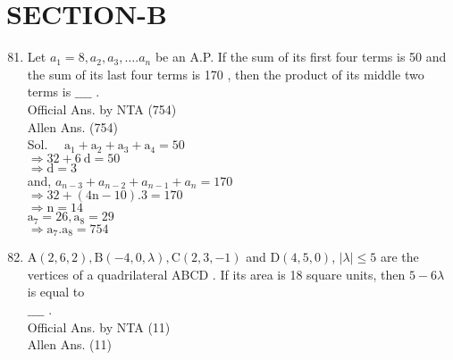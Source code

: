 \documentclass[10pt]{article}
\begin{document}
\section*{SECTION-B}
\begin{enumerate}
  \setcounter{enumi}{80}
  \item Let \(a_{1}=8, a_{2}, a_{3}, \ldots . a_{n}\) be an A.P. If the sum of its first four terms is 50 and the sum of its last four terms is 170 , then the product of its middle two terms is \(\_\_\_\_\) .\\
Official Ans. by NTA (754)\\
Allen Ans. (754)\\
Sol. \(\quad \mathrm{a}_{1}+\mathrm{a}_{2}+\mathrm{a}_{3}+\mathrm{a}_{4}=50\)\\
\(\Rightarrow 32+6 \mathrm{~d}=50\)\\
\(\Rightarrow \mathrm{d}=3\)\\
and, \(a_{n-3}+a_{n-2}+a_{n-1}+a_{n}=170\)\\
\(\Rightarrow 32+(4 \mathrm{n}-10) .3=170\)\\
\(\Rightarrow \mathrm{n}=14\)\\
\(\mathrm{a}_{7}=26, \mathrm{a}_{8}=29\)\\
\(\Rightarrow \mathrm{a}_{7} . \mathrm{a}_{8}=754\)
  \item \(\mathrm{A}(2,6,2), \mathrm{B}(-4,0, \lambda), \mathrm{C}(2,3,-1)\) and \(\mathrm{D}(4,5,0)\), \(|\lambda| \leq 5\) are the vertices of a quadrilateral ABCD . If its area is 18 square units, then \(5-6 \lambda\) is equal to\\
\(\_\_\_\_\) .\\
Official Ans. by NTA (11)\\
Allen Ans. (11)
\end{enumerate}
\end{document}
